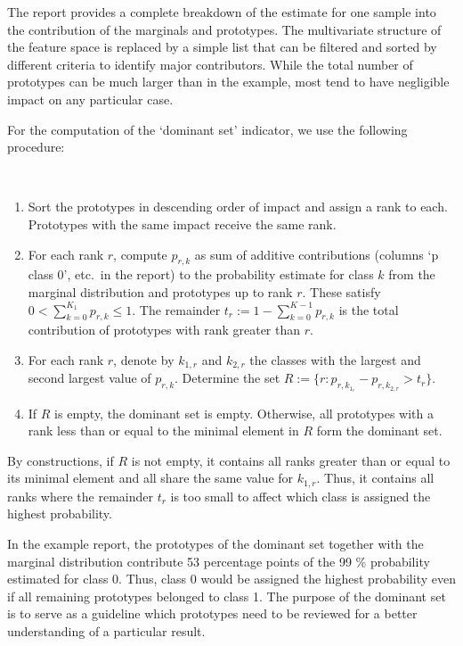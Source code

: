 %
The report provides a complete breakdown of the estimate for one sample into the contribution of the marginals and prototypes.
The multivariate structure of the feature space is replaced by a simple list that can be filtered and sorted by different criteria to identify major contributors.
While the total number of prototypes can be much larger than in the example, most tend to have negligible impact on any particular case.\par
%
For the computation of the `dominant set' indicator, we use the following procedure:
%
\begin{algorithm}~
\label{alg_dominant_set}
%
\begin{enumerate}
\item Sort the prototypes in descending order of impact and assign a rank to each.
Prototypes with the same impact receive the same rank.
%
\item For each rank $r$, compute $p_{r,k}$ as sum of additive contributions (columns `p class 0', etc.\ in the report) to the probability estimate for class $k$ from the marginal distribution and prototypes up to rank $r$.
These satisfy $0<\sum_{k=0}^{K_1}p_{r,k}\leq 1$.
The remainder $t_r:=1-\sum_{k=0}^{K-1}p_{r,k}$ is the total contribution of prototypes with rank greater than $r$.
%
\item For each rank $r$, denote by $k_{1,r}$ and $k_{2,r}$ the classes with the largest and second largest value of $p_{r,k}$.
Determine the set  $R:=\{r:p_{r,k_{1_r}}-p_{r,k_{2,r}}>t_r\}$.
%
\item If $R$ is empty, the dominant set is empty.
Otherwise, all prototypes with a rank less than or equal to the minimal element in $R$ form the dominant set.
\end{enumerate}
\end{algorithm}
%
\begin{remark}
By constructions, if $R$ is not empty, it contains all ranks greater than or equal to its minimal element and all share the same value for $k_{1,r}$.
Thus, it contains all ranks where the remainder $t_r$ is too small to affect which class is assigned the highest probability.
\end{remark}
%
In the example report, the prototypes of the dominant set together with the marginal distribution contribute 53 percentage points of the 99 \% probability estimated for class 0.
Thus, class 0 would be assigned the highest probability even if all remaining prototypes belonged to class 1.
The purpose of the dominant set is to serve as a guideline which prototypes need to be reviewed for a better understanding of a particular result.\par
